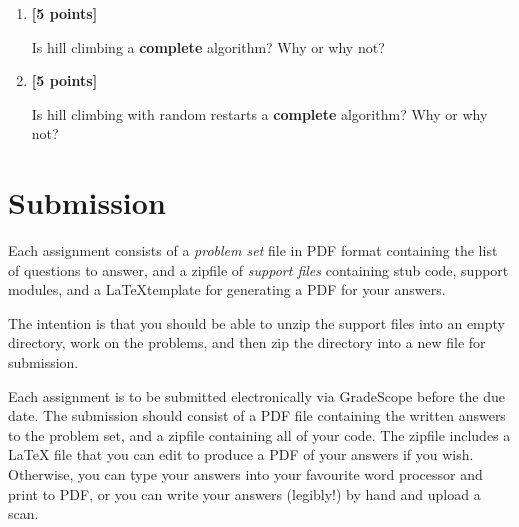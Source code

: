 \documentclass{article}
\newcounter{totalpoints}
\newcommand{\points}[1]{{\addtocounter{totalpoints}{#1}\textbf{[#1 points]}}}
\begin{document}
\begin{enumerate}
\begin{enumerate}
\begin{enumerate}[i.]
        \item Solving a Sudoku problem:
        \begin{answer}{3\baselineskip}
        \end{answer}
    \end{enumerate}

    \item \points{5} Is hill climbing a \textbf{complete} algorithm?  Why or why not?

    \begin{answer}{1in}
    \end{answer}
    
    \clearpage
    \item \points{5} Is hill climbing with random restarts a \textbf{complete} algorithm?  Why or why not?

    \begin{answer}{1in}
    \end{answer}

\end{enumerate}

\end{enumerate}


\section*{Submission}
Each assignment consists of a \emph{problem set} file in PDF format containing the list of questions to answer, and a zipfile of \emph{support files} containing stub code, support modules, and a \LaTeX template for generating a PDF for your answers.

The intention is that you should be able to unzip the support files into an empty directory, work on the problems, and then zip the directory into a new file for submission.

Each assignment is to be submitted electronically via GradeScope before the due date.  The submission should consist of a PDF file containing the written answers to the problem set, and a zipfile containing all of your code.  The zipfile includes a LaTeX file that you can edit to produce a PDF of your answers if you wish.  Otherwise, you can type your answers into your favourite word processor and print to PDF, or you can write your answers (legibly!) by hand and upload a scan.


%
%
\end{document}
